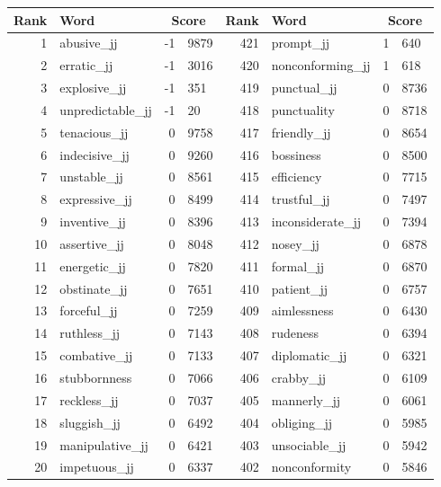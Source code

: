 \begin{table}[tbp]
    \begin{tabular}{| rlr@{.}l | rlr@{.}l |}
    \hline
    \textbf{Rank} & \textbf{Word} & \multicolumn{2}{c|}{\textbf{Score}} & \textbf{Rank} & \textbf{Word} & \multicolumn{2}{c|}{\textbf{Score}} \\
    \hline
    1 & abusive\_jj & -1 & 9879    &    421 & prompt\_jj & 1 & 640 \\
    2 & erratic\_jj & -1 & 3016    &    420 & nonconforming\_jj & 1 & 618 \\
    3 & explosive\_jj & -1 & 351    &    419 & punctual\_jj & 0 & 8736 \\
    4 & unpredictable\_jj & -1 & 20    &    418 & punctuality & 0 & 8718 \\
    5 & tenacious\_jj & 0 & 9758    &    417 & friendly\_jj & 0 & 8654 \\
    6 & indecisive\_jj & 0 & 9260    &    416 & bossiness & 0 & 8500 \\
    7 & unstable\_jj & 0 & 8561    &    415 & efficiency & 0 & 7715 \\
    8 & expressive\_jj & 0 & 8499    &    414 & trustful\_jj & 0 & 7497 \\
    9 & inventive\_jj & 0 & 8396    &    413 & inconsiderate\_jj & 0 & 7394 \\
    10 & assertive\_jj & 0 & 8048    &    412 & nosey\_jj & 0 & 6878 \\
    11 & energetic\_jj & 0 & 7820    &    411 & formal\_jj & 0 & 6870 \\
    12 & obstinate\_jj & 0 & 7651    &    410 & patient\_jj & 0 & 6757 \\
    13 & forceful\_jj & 0 & 7259    &    409 & aimlessness & 0 & 6430 \\
    14 & ruthless\_jj & 0 & 7143    &    408 & rudeness & 0 & 6394 \\
    15 & combative\_jj & 0 & 7133    &    407 & diplomatic\_jj & 0 & 6321 \\
    16 & stubbornness & 0 & 7066    &    406 & crabby\_jj & 0 & 6109 \\
    17 & reckless\_jj & 0 & 7037    &    405 & mannerly\_jj & 0 & 6061 \\
    18 & sluggish\_jj & 0 & 6492    &    404 & obliging\_jj & 0 & 5985 \\
    19 & manipulative\_jj & 0 & 6421    &    403 & unsociable\_jj & 0 & 5942 \\
    20 & impetuous\_jj & 0 & 6337    &    402 & nonconformity & 0 & 5846 \\

\end{tabular}
\end{table}
